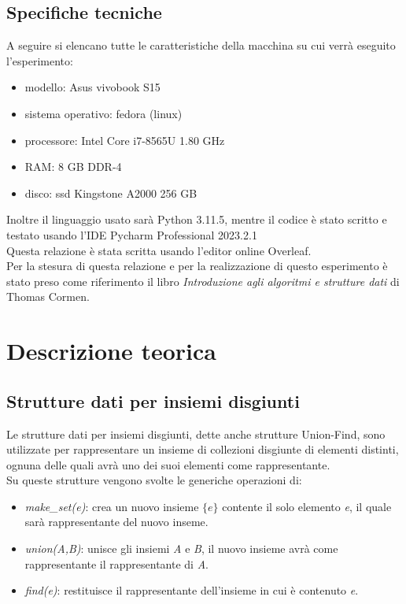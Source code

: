 \documentclass[12pt]{article}
\begin{document}
\subsection{Specifiche tecniche}
A seguire si elencano tutte le caratteristiche della macchina su cui verrà eseguito l'esperimento:
\begin{itemize}
    \item modello: Asus vivobook S15
    \item sistema operativo: fedora (linux)
    \item processore: Intel Core i7-8565U 1.80 GHz
    \item RAM: 8 GB DDR-4
    \item disco: ssd Kingstone A2000 256 GB

\end{itemize}
Inoltre il linguaggio usato sarà Python 3.11.5, mentre il codice è stato scritto e testato usando l'IDE Pycharm Professional 2023.2.1
\\ Questa relazione è stata scritta usando l'editor online Overleaf.\\
Per la stesura di questa relazione e per la realizzazione di questo esperimento è stato preso come riferimento il libro \cite{2010Iaae} \textit{Introduzione agli algoritmi e strutture dati} di Thomas Cormen.


\section{Descrizione teorica}
\subsection{Strutture dati per insiemi disgiunti}
Le strutture dati per insiemi disgiunti, dette anche strutture Union-Find, sono utilizzate per rappresentare un insieme di collezioni disgiunte di elementi distinti, ognuna delle quali avrà uno dei suoi elementi come rappresentante.
\\Su queste strutture vengono svolte le generiche operazioni di:
\begin{itemize}
    \item \textit{make\_set(e)}: crea un nuovo insieme $\{e\}$ contente il solo elemento \textit{e}, il quale sarà rappresentante del nuovo inseme.
    \item \textit{union(A,B)}: unisce gli insiemi \textit{A} e \textit{B}, il nuovo insieme avrà come rappresentante il rappresentante di \textit{A}.
    \item \textit{find(e)}: restituisce il rappresentante dell'insieme in cui è contenuto \textit{e}.
\end{itemize}
\end{document}
